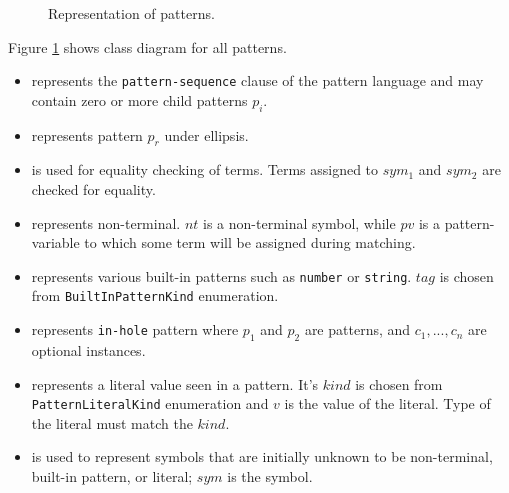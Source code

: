 \begin{figure}[H]
	\centering
	\caption{Representation of patterns.}
\label{class-diagram-pattern}
\end{figure}

Figure \ref{class-diagram-pattern} shows class diagram for all patterns.

\begin{itemize}
\item
\PatternSequence \space represents the \texttt{pattern-sequence} clause of the pattern language and may contain zero or more child patterns $p_i$. 

\item 
\PatternRepeat \space represents pattern $p_r$ under ellipsis.

\item
\PatternCheckConstraint is used for equality checking of terms. Terms assigned to $sym_1$ and $sym_2$ are checked for equality.

\item 
\NonTerminal \space represents non-terminal. $nt$ is a non-terminal symbol, while $pv$ is a pattern-variable to which some term will be assigned during matching. 

\item
\BuiltInPattern \space represents various built-in patterns such as \texttt{number} or \texttt{string}. $tag$ is chosen from \texttt{BuiltInPatternKind} enumeration.

\item
\PatternInHole \space represents \texttt{in-hole} pattern where $p_1$ and $p_2$ are patterns, and $c_1, ..., c_n$ are optional \ConstraintCheckNoArg instances.

\item 
\LiteralPattern \space represents a literal value seen in a pattern. It's $kind$ is chosen from \texttt{PatternLiteralKind} enumeration and $v$ is the value of the literal. Type of the literal must match the $kind$.

\item 
\UnresolvedSymbol is used to represent symbols that are initially unknown to be non-terminal, built-in pattern, or literal; $sym$ is the symbol.

\end{itemize}
